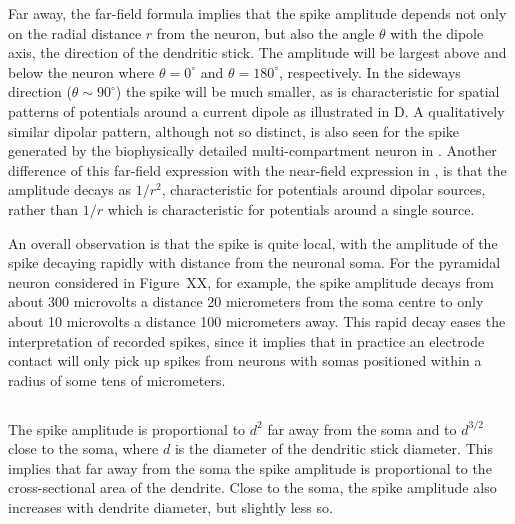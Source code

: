 Far away, the far-field formula  implies that the spike amplitude depends not only on the radial distance $r$ from the neuron, but also the angle $\theta$ with the dipole axis, the direction of the dendritic stick. The amplitude will be largest above and below the neuron where $\theta=0^\circ$ and $\theta=180^\circ$, respectively. In the sideways direction ($\theta \sim 90^\circ$) the spike will be much smaller, as is characteristic for spatial patterns of potentials around a current dipole as illustrated in D. A qualitatively similar dipolar pattern, although not so distinct, is also seen for the spike generated by the biophysically detailed multi-compartment neuron in 
.
Another difference of this far-field expression with the near-field expression in , is that the
amplitude decays as $1/r^2$, characteristic for potentials around dipolar sources, rather than $1/r$ which is characteristic for potentials around 
a single source. %

An overall observation is that the spike is quite local, with the amplitude of the spike decaying rapidly with distance from the neuronal soma. For the pyramidal neuron considered in Figure~XX, for example, the spike amplitude decays from about
300 microvolts a distance 20 micrometers from the soma centre to only about 10 microvolts a
distance 100 micrometers away.  This rapid decay eases the interpretation of recorded spikes, since it implies that in practice an electrode contact will only pick up spikes from neurons with somas positioned within a radius of some tens of micrometers.

\subsection{}
The spike amplitude is proportional to $d^{2}$ far away from the soma and to $d^{3/2}$ close to the soma,
where $d$ is the diameter of the dendritic stick diameter. This implies that far away from the soma the spike amplitude is proportional to  the cross-sectional area of the dendrite. Close to the soma, the spike amplitude also increases with dendrite diameter, but slightly less so.

